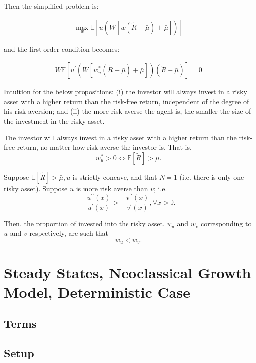 \documentclass[10pt]{article}
\begin{document}
Then the simplified problem is:

\begin{align}
    \max _w \mathbb{E}[u(W[w(\tilde{R}-\bar{\mu})+\bar{\mu}])]
\end{align}

and the first order condition becomes:

\begin{align}
    W \mathbb{E}\left[u^{\prime}\left(W\left[w_u^*(\tilde{R}-\bar{\mu})+\bar{\mu}\right]\right)(\tilde{R}-\bar{\mu})\right]=0
\end{align}

Intuition for the below propositions: 
(i) the investor will always invest in a risky asset with a higher return than the risk-free return, independent of the degree of his risk aversion; and (ii) the more risk averse the agent is, the smaller the size of the investment in the risky asset.

\begin{proposition} 
    The investor will always invest in a risky asset with a higher return than the risk-free return, no matter how risk averse the investor is. That is,
    $$
    w_u^*>0 \Leftrightarrow \mathbb{E}[\tilde{R}]>\bar{\mu} .
    $$ 
\end{proposition}

\begin{proposition} 
    Suppose $\mathbb{E}[\tilde{R}]>\bar{\mu}, u$ is strictly concave, and that $N=1$ (i.e. there is only one risky asset). Suppose $u$ is more risk averse than $v$; i.e.
    $$
    -\frac{u^{\prime \prime}(x)}{u^{\prime}(x)}>-\frac{v^{\prime \prime}(x)}{v^{\prime}(x)}, \forall x>0 .
    $$
    
    Then, the proportion of invested into the risky asset, $w_u$ and $w_v$ corresponding to $u$ and $v$ respectively, are such that
    $$
    w_u<w_v .
    $$ 
\end{proposition}

\section{Steady States, Neoclassical Growth Model, Deterministic Case}

\subsection{Terms}



\subsection{Setup}
\end{document}

